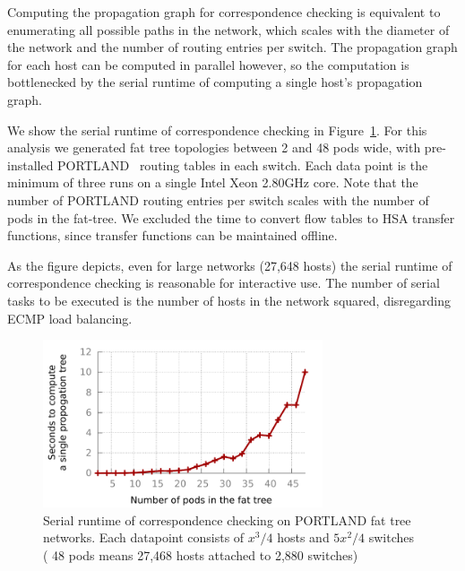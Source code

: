 
 Computing the propagation
graph for correspondence checking is equivalent to enumerating
all possible paths in the network, which scales with the diameter
of the network and the number of routing entries per switch.
The propagation graph for each host can be
computed in parallel however, so the computation is bottlenecked by the serial runtime
of computing a single host's propagation graph.

We show the serial runtime of correspondence checking in 
Figure~\ref{fig:hsa_runtime}. For this analysis we generated fat tree topologies
between 2 and 48 pods wide, with pre-installed PORTLAND~\cite{NiranjanMysore:2009:PSF:1592568.1592575}
routing tables in each switch. Each data point is the minimum of three
runs on a single Intel Xeon 2.80GHz core. Note that the number of PORTLAND routing entries per switch scales with the number
of pods in the fat-tree. We excluded the time to convert
flow tables to HSA transfer functions, since transfer functions can be maintained
offline.

As the figure depicts, even for large networks
(27,648 hosts) the serial runtime of correspondence checking is reasonable for
interactive use. The number of serial tasks to be executed
is the number of hosts in the network squared, disregarding ECMP load balancing.

\begin{figure}[t]
    \includegraphics[width=3.25in]{../graphs/hsa_overhead_graph/graph.pdf}
    \caption[]{\label{fig:hsa_runtime} Serial runtime of correspondence
    checking on PORTLAND fat tree networks. Each datapoint consists of
    $x^3/4$ hosts and $5x^2/4$ switches (\eg{} 48 pods means 27,468 hosts
    attached to 2,880 switches)}
\end{figure}

